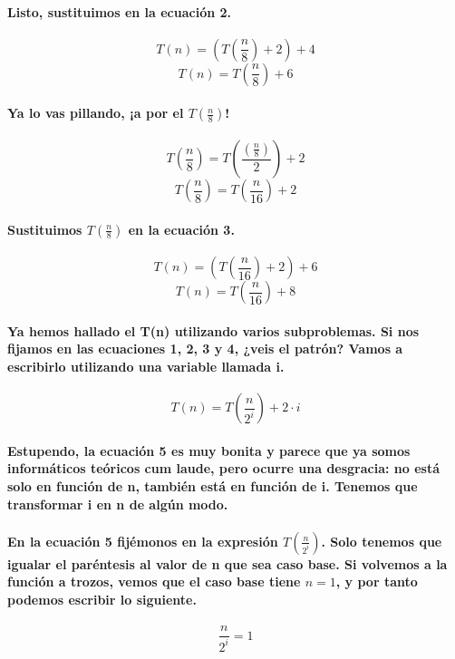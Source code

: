 \documentclass{book}
\begin{document}
	\paragraph{Listo, sustituimos en la ecuación 2.}
	\begin{equation}
		T(n) = (T(\frac{n}{8}) + 2) + 4 \nonumber  
	\end{equation}
	\begin{equation}
		T(n) = T(\frac{n}{8}) + 6 
	\end{equation}
	\paragraph{Ya lo vas pillando, ¡a por el $T(\frac{n}{8})$!}
	\begin{equation}
		T(\frac{n}{8}) = T(\frac{(\frac{n}{8})}{2}) + 2 \nonumber 
	\end{equation}
	\begin{equation}
		T(\frac{n}{8}) = T(\frac{n}{16}) + 2 \nonumber 
	\end{equation}	
	\paragraph{Sustituimos $T(\frac{n}{8})$ en la ecuación 3.}
	\begin{equation}
		T(n) = (T(\frac{n}{16}) + 2) + 6 \nonumber  
	\end{equation}	
	\begin{equation}
		T(n) = T(\frac{n}{16}) + 8 
	\end{equation}	
	\paragraph{Ya hemos hallado el T(n) utilizando varios subproblemas. Si nos fijamos en las ecuaciones 1, 2, 3 y 4, ¿veis el patrón? Vamos a escribirlo utilizando una variable llamada i.}
	\begin{equation}
		T(n) = T(\frac{n}{2^i}) + 2 \cdot i 
	\end{equation}
	\paragraph{Estupendo, la ecuación 5 es muy bonita y parece que ya somos informáticos teóricos cum laude, pero ocurre una desgracia: no está solo en función de n, también está en función de i. Tenemos que transformar i en n de algún modo.}
	\paragraph{En la ecuación 5 fijémonos en la expresión $T(\frac{n}{2^i})$. Solo tenemos que igualar el paréntesis al valor de n que sea caso base. Si volvemos a la función a trozos, vemos que el caso base tiene $n=1$, y por tanto podemos escribir lo siguiente.}
	\begin{equation}
		\frac{n}{2^i} = 1 \nonumber 
	\end{equation}
\end{document}
